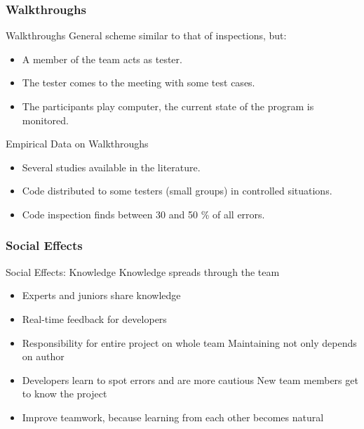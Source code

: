 \subsubsection*{Walkthroughs}

\begin{Frame}{Walkthroughs}
  General scheme similar to that of inspections, but:
  \begin{itemize}
    \item A member of the team acts as \alert{tester}.
    \item The tester comes to the meeting with some test cases.
    \item The participants \alert{play computer}, the current state of the program is monitored.
  \end{itemize}
\end{Frame}

\begin{Frame}{Empirical Data on Walkthroughs}
  \begin{itemize}
    \item Several studies available in the literature.
    \item Code distributed to some testers (small groups) in controlled situations.
    \item Code inspection finds between 30 and 50 \% of all errors.
  \end{itemize}
\end{Frame}

\subsubsection*{Social Effects}

\begin{Frame}[fragile]{Social Effects: Knowledge}
  Knowledge spreads through the team
  \begin{itemize}
    \item Experts and juniors share knowledge
    \item Real-time feedback for developers
    \item \alert{Responsibility} for entire project on whole team Maintaining not only depends on author
    \item Developers learn to spot errors and are more cautious New team members get to know the project
    \item Improve teamwork, because learning from each other becomes natural
  \end{itemize}
\end{Frame}

